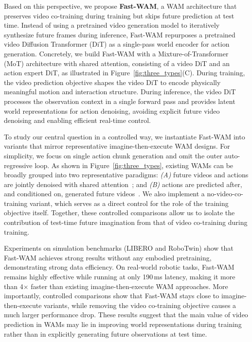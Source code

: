 Based on this perspective, we propose \textbf{Fast-WAM}, a WAM architecture that preserves video co-training during training but skips future prediction at test time. Instead of using a pretrained video generation model to iteratively synthesize future frames during inference, Fast-WAM repurposes a pretrained video Diffusion Transformer (DiT) as a single-pass world encoder for action generation. Concretely, we build Fast-WAM with a Mixture-of-Transformer (MoT) architecture with shared attention, consisting of a video DiT and an action expert DiT, as illustrated in Figure~\ref{fig:three_types}(C). During training, the video prediction objective shapes the video DiT to encode physically meaningful motion and interaction structure. During inference, the video DiT processes the observation context in a single forward pass and provides latent world representations for action denoising, avoiding explicit future video denoising and enabling efficient real-time control.

To study our central question in a controlled way, we instantiate Fast-WAM into variants that mirror representative imagine-then-execute WAM designs. For simplicity, we focus on single action chunk generation and omit the outer auto-regressive loop. As shown in Figure~\ref{fig:three_types}, existing WAMs can be broadly grouped into two representative paradigms: \emph{(A)} future videos and actions are jointly denoised with shared attention~\cite{ye2026worldactionmodelszeroshot, zhu2025unifiedworldmodelscoupling, bi2025motusunifiedlatentaction}; and \emph{(B)} actions are predicted after, and conditioned on, generated future videos~\cite{lingbot-va2026, feng2025vidarembodiedvideodiffusion, du2023learninguniversalpoliciestextguided}. We also implement a no-video-co-training variant, which serves as a direct control for the role of the training objective itself. Together, these controlled comparisons allow us to isolate the contribution of test-time future imagination from that of video co-training during training.

Experiments on simulation benchmarks (LIBERO and RoboTwin) show that Fast-WAM achieves strong results without any embodied pretraining, demonstrating strong data efficiency. On real-world robotic tasks, Fast-WAM remains highly effective while running at only 190\,ms latency, making it more than 4$\times$ faster than existing imagine-then-execute WAM approaches. More importantly, controlled comparisons show that Fast-WAM stays close to imagine-then-execute variants, while removing the video co-training objective causes a much larger performance drop. These results suggest that the main value of video prediction in WAMs may lie in improving world representations during training rather than in explicitly generating future observations at test time.

